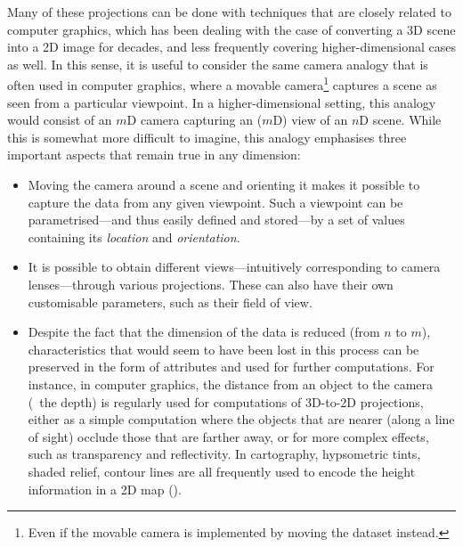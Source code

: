 Many of these projections can be done with techniques that are closely related to computer graphics, which has been dealing with the case of converting a 3D scene into a 2D image for decades, and less frequently covering higher-dimensional cases as well.
In this sense, it is useful to consider the same camera analogy that is often used in computer graphics, where a movable camera\footnote{Even if the movable camera is implemented by moving the dataset instead.} captures a scene as seen from a particular viewpoint.
In a higher-dimensional setting, this analogy would consist of an $m$D camera capturing an ($m$D) view of an $n$D scene.
While this is somewhat more difficult to imagine, this analogy emphasises three important aspects that remain true in any dimension:

\begin{itemize}
\item
Moving the camera around a scene and orienting it makes it possible to capture the data from any given viewpoint.
Such a viewpoint can be parametrised---and thus easily defined and stored---by a set of values containing its \emph{location} and \emph{orientation}.

\item
It is possible to obtain different views---intuitively corresponding to camera lenses---through various projections.
These can also have their own customisable parameters, such as their field of view.

\item
Despite the fact that the dimension of the data is reduced (from $n$ to $m$), characteristics that would seem to have been lost in this process can be preserved in the form of attributes and used for further computations.
For instance, in computer graphics, the distance from an object to the camera (\ie\ the depth) is regularly used for computations of 3D-to-2D projections, either as a simple computation where the objects that are nearer (along a line of sight) occlude those that are farther away, or for more complex effects, such as transparency and reflectivity.
In cartography, hypsometric tints, shaded relief, contour lines are all frequently used to encode the height information in a 2D map ().
\end{itemize}

